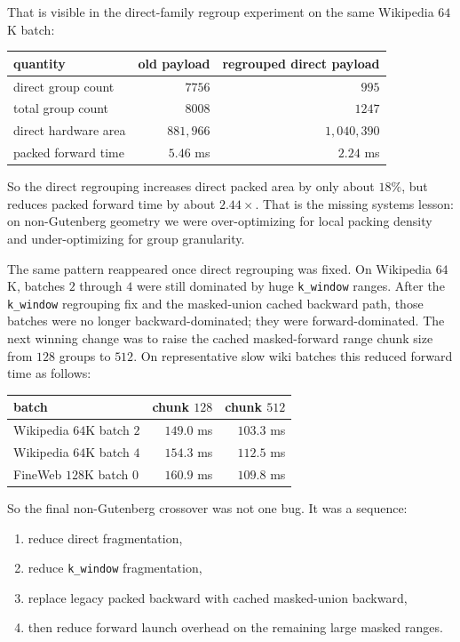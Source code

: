 \documentclass[11pt]{article}
\begin{document}
That is visible in the direct-family regroup experiment on the same Wikipedia
$64$K batch:

\begin{center}
\begin{tabular}{lrr}
\toprule
quantity & old payload & regrouped direct payload \\
\midrule
direct group count & \(7756\) & \(995\) \\
total group count & \(8008\) & \(1247\) \\
direct hardware area & \(881{,}966\) & \(1{,}040{,}390\) \\
packed forward time & \(5.46\) ms & \(2.24\) ms \\
\bottomrule
\end{tabular}
\end{center}

So the direct regrouping increases direct packed area by only about \(18\%\),
but reduces packed forward time by about \(2.44\times\). That is the missing
systems lesson: on non-Gutenberg geometry we were over-optimizing for local
packing density and under-optimizing for group granularity.

The same pattern reappeared once direct regrouping was fixed. On Wikipedia
\(64\)K, batches \(2\) through \(4\) were still dominated by huge
\texttt{k\_window} ranges. After the \texttt{k\_window} regrouping fix and the
masked-union cached backward path, those batches were no longer
backward-dominated; they were forward-dominated. The next winning change was to
raise the cached masked-forward range chunk size from \(128\) groups to
\(512\). On representative slow wiki batches this reduced forward time as
follows:
\begin{center}
\begin{tabular}{lrr}
\toprule
batch & chunk \(128\) & chunk \(512\) \\
\midrule
Wikipedia $64$K batch $2$ & $149.0$ ms & $103.3$ ms \\
Wikipedia $64$K batch $4$ & $154.3$ ms & $112.5$ ms \\
FineWeb $128$K batch $0$ & $160.9$ ms & $109.8$ ms \\
\bottomrule
\end{tabular}
\end{center}

So the final non-Gutenberg crossover was not one bug. It was a sequence:
\begin{enumerate}[leftmargin=1.5em]
    \item reduce direct fragmentation,
    \item reduce \texttt{k\_window} fragmentation,
    \item replace legacy packed backward with cached masked-union backward,
    \item then reduce forward launch overhead on the remaining large masked
    ranges.
\end{enumerate}
\end{document}
